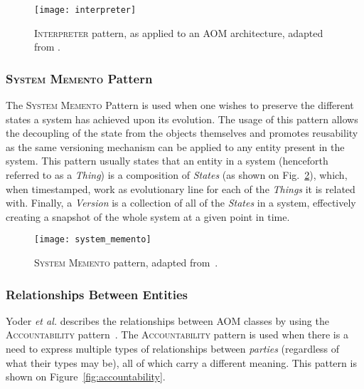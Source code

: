 \begin{figure}[H]
  \centering
  \texttt{[image: interpreter]}
  \caption[\textsc{Interpreter} pattern, as applied to an AOM architecture]{\textsc{Interpreter} pattern, as applied to an AOM architecture, adapted from \cite{gang_of_four}.}
  \label{fig:interpreter_pattern}
\end{figure}

\subsubsection{\textsc{System Memento} Pattern}\label{sec:system_memento_pattern}

The \textsc{System Memento} Pattern is used when one wishes to preserve the different states a system has achieved upon its evolution. The usage of this pattern allows the decoupling of the state from the objects themselves and promotes reusability as the same versioning mechanism can be applied to any entity present in the system. This pattern usually states that an entity in a system (henceforth referred to as a \emph{Thing}) is a composition of \emph{States} (as shown on Fig.~\ref{fig:system_memento}), which, when timestamped, work as evolutionary line for each of the \emph{Things} it is related with. Finally, a \emph{Version} is a collection of all of the \emph{States} in a system, effectively creating a snapshot of the whole system at a given point in time.

\begin{figure}[H]
  \centering
  \texttt{[image: system\_memento]}
  \caption[\textsc{System Memento} pattern]{\textsc{System Memento} pattern, adapted from~\cite{patterns_data_and_metadata_evolution_in_aoms}.}
  \label{fig:system_memento}
\end{figure}

\subsubsection{Relationships Between Entities}\label{sec:relationships_between_entities}

Yoder \textit{et al.}\cite{YJ02} describes the relationships between AOM classes by using the \textsc{Accountability} pattern~\cite{fowler, hay}. The \textsc{Accountability} pattern is used when there is a need to express multiple types of relationships between \emph{parties} (regardless of what their types may be), all of which carry a different meaning\cite{fowler_accountability}. This pattern is shown on Figure~\ref{fig:accountability}.

